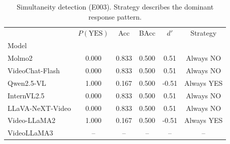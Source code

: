 \begin{table}[t]
\centering
\small
\caption{Simultaneity detection (E003). Strategy describes the dominant response pattern.}
\label{tab:simult}
\begin{tabular}{lccccc}
\toprule
 & $P(\text{YES})$ & Acc & BAcc & $d'$ & Strategy \\
Model &  &  &  &  &  \\
\midrule
Molmo2 & 0.000 & 0.833 & 0.500 & 0.51 & Always NO \\
VideoChat-Flash & 0.000 & 0.833 & 0.500 & 0.51 & Always NO \\
Qwen2.5-VL & 1.000 & 0.167 & 0.500 & -0.51 & Always YES \\
InternVL2.5 & 0.000 & 0.833 & 0.500 & 0.51 & Always NO \\
LLaVA-NeXT-Video & 0.000 & 0.833 & 0.500 & 0.51 & Always NO \\
Video-LLaMA2 & 1.000 & 0.167 & 0.500 & -0.51 & Always YES \\
VideoLLaMA3 & -- & -- & -- & -- & -- \\
\bottomrule
\end{tabular}
\end{table}
